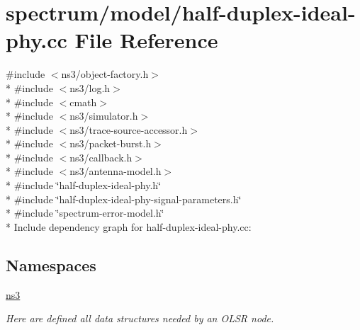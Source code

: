 \hypertarget{half-duplex-ideal-phy_8cc}{}\section{spectrum/model/half-\/duplex-\/ideal-\/phy.cc File Reference}
\label{half-duplex-ideal-phy_8cc}
{\ttfamily \#include $<$ns3/object-\/factory.\+h$>$}\\*
{\ttfamily \#include $<$ns3/log.\+h$>$}\\*
{\ttfamily \#include $<$cmath$>$}\\*
{\ttfamily \#include $<$ns3/simulator.\+h$>$}\\*
{\ttfamily \#include $<$ns3/trace-\/source-\/accessor.\+h$>$}\\*
{\ttfamily \#include $<$ns3/packet-\/burst.\+h$>$}\\*
{\ttfamily \#include $<$ns3/callback.\+h$>$}\\*
{\ttfamily \#include $<$ns3/antenna-\/model.\+h$>$}\\*
{\ttfamily \#include \char`\"{}half-\/duplex-\/ideal-\/phy.\+h\char`\"{}}\\*
{\ttfamily \#include \char`\"{}half-\/duplex-\/ideal-\/phy-\/signal-\/parameters.\+h\char`\"{}}\\*
{\ttfamily \#include \char`\"{}spectrum-\/error-\/model.\+h\char`\"{}}\\*
Include dependency graph for half-\/duplex-\/ideal-\/phy.cc\+:
\subsection*{Namespaces}
\begin{DoxyCompactItemize}
\item 
 \hyperlink{namespacens3}{ns3}
\begin{DoxyCompactList}\small\item\em Here are defined all data structures needed by an O\+L\+SR node. \end{DoxyCompactList}\end{DoxyCompactItemize}
